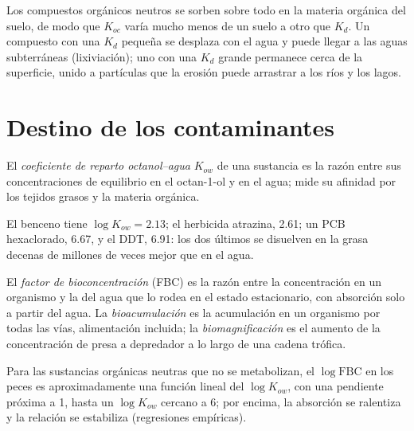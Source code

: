 Los compuestos orgánicos neutros se sorben sobre todo en la materia orgánica del suelo, de modo que $K_{oc}$ varía
mucho menos de un suelo a otro que $K_d$. Un compuesto con una $K_d$ pequeña se desplaza con el agua
y puede llegar a las aguas subterráneas (lixiviación); uno con una $K_d$ grande permanece cerca de la superficie,
unido a partículas que la erosión puede arrastrar a los ríos y los lagos.

\section{Destino de los contaminantes}

\begin{definition}\label{def:b3:environmental-toxicology:kow}
El \emph{coeficiente de reparto octanol--agua}
$K_{ow}$ de una sustancia es la razón entre sus concentraciones de equilibrio en el
octan-1-ol y en el agua; mide su afinidad por los tejidos grasos y la materia
orgánica.
\end{definition}

El benceno tiene $\log K_{ow} = 2.13$; el herbicida atrazina, 2.61; un PCB hexaclorado, 6.67, y el
DDT, 6.91: los dos últimos se disuelven en la grasa decenas de millones de veces mejor que en el
agua.

\begin{definition}[Bioacumulación]\label{def:b3:environmental-toxicology:bio}
El \emph{factor de bioconcentración} (FBC) es la
razón entre la concentración en un organismo y la del agua que lo rodea en el estado
estacionario, con absorción solo a partir del agua. La \emph{bioacumulación}
es la acumulación en un organismo por todas las vías, alimentación incluida;
la \emph{biomagnificación} es el aumento de la
concentración de presa a depredador a lo largo de una cadena trófica.
\end{definition}

\begin{proposition}[FBC y $K_{ow}$]\label{prop:b3:environmental-toxicology:bcf-kow}
Para las sustancias orgánicas neutras que no se metabolizan, el $\log\mathrm{FBC}$ en los peces es
aproximadamente una función lineal del $\log K_{ow}$, con una pendiente próxima a 1, hasta un $\log K_{ow}$ cercano a 6;
por encima, la absorción se ralentiza y la relación se estabiliza (regresiones empíricas).
\admitted
\end{proposition}


